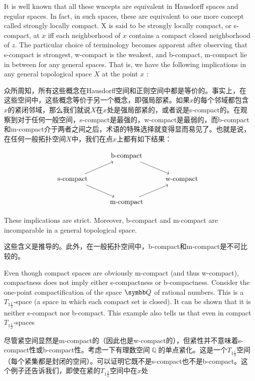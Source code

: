 \documentclass[options]{article}
\begin{document}
\begin{paracol}{2}
	\begin{en}
		It is well known that all these wncepts are equivalent in Hausdorff spaces and regular spaces. In fact, in such spaces, these are equivalent to one more concept called strongly locally compact. X is said to be strongly locally compact, or s-compact, at $x$ iff each neighborhood of $x$ contains a compact closed neighborhood of $z$. The particular choice of terminology becomes apparent after observing that s-compact is strongest, w-compact is the weakest, and b-compact, m-compact lie in between for any general spaces. That is, we have the following implications in any general topological space $X$ at the point $x$ :
	\end{en}
	\begin{cn}
		众所周知，所有这些概念在Hausdorff空间和正则空间中都是等价的。事实上，在这些空间中，这些概念等价于另一个概念，即强局部紧。如果$x$的每个邻域都包含$x$的紧闭邻域，那么我们就说$X$在$x$处是强局部紧的，或者说是s-compact的。在观察到对于任何一般空间，s-compact是最强的，w-compact是最弱的，而b-compact和m-compact介于两者之间之后，术语的特殊选择就变得显而易见了。也就是说，在任何一般拓扑空间$X$中，我们在点$x$上都有如下结果：
	\end{cn}
\end{paracol}
\[
		\begin{tikzcd}
			& \text{b-compact}\ar[rd]&\\
			\text{s-compact}\ar[ru]\ar[rd]&&\text{w-compact}\\
			&\text{m-compact}\ar[ru]&
		\end{tikzcd}
\]
\begin{paracol}{2}
	\begin{en}
		\noindent
		These implications are strict. Moreover, b-compact and m-compact are incomparable in a general topological space.
	\end{en}
	\begin{cn}
		\noindent
		这些含义是推导的。此外，在一般拓扑空间中，b-compact和m-compact是不可比较的。
	\end{cn}
	\begin{en}
		Even though compact spaces are obviously m-compact (and thus w-compact), compactness does not imply either s-compactness or b-compactness. Consider the one-point compactification of the space $\symbb Q$ of rational numbers. This is a $T_{1\frac{1}{2}}$-space (a space in which each compact set is closed). It can be shown that it is neither s-compact nor b-compact. This example also tells us that even in compact $T_{1 \frac{1}{2}}$-spaces
	\end{en}
	\begin{cn}
		尽管紧空间显然是m-compact的（因此也是w-compact的），但紧性并不意味着s-compact性或b-compact性。考虑一下有理数空间$\BbbQ$的单点紧化。这是一个$T_{1\frac{1}{2}}$空间（每个紧集都是封闭的空间）。可以证明它既不是s-compact也不是b-compact。这个例子还告诉我们，即使在紧的$T_{1\frac{2}{2}}$空间中在$x$处
	\end{cn}
\end{paracol}
\end{document}
